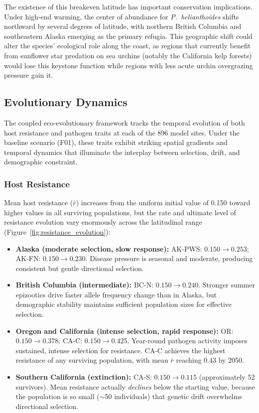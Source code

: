 The existence of this breakeven latitude has important conservation
implications.  Under high-end warming, the center of abundance for
\textit{P.~helianthoides} shifts northward by several degrees of
latitude, with northern British Columbia and southeastern Alaska
emerging as the primary refugia.  This geographic shift could alter the
species' ecological role along the coast, as regions that currently
benefit from sunflower star predation on sea urchins (notably the
California kelp forests) would lose this keystone function while
regions with less acute urchin overgrazing pressure gain it.

\subsection{Evolutionary Dynamics}
\label{sec:evo_dynamics}

The coupled eco-evolutionary framework tracks the temporal evolution of
both host resistance and pathogen traits at each of the 896 model
sites.  Under the baseline scenario (F01), these traits exhibit
striking spatial gradients and temporal dynamics that illuminate the
interplay between selection, drift, and demographic constraint.

\subsubsection{Host Resistance}

Mean host resistance ($\bar{r}$) increases from the uniform initial
value of 0.150 toward higher values in all surviving populations, but
the rate and ultimate level of resistance evolution vary enormously
across the latitudinal range
(Figure~\ref{fig:resistance_evolution}):

\begin{itemize}
  \item \textbf{Alaska (moderate selection, slow response):}
    AK-PWS: $0.150 \rightarrow 0.253$;
    AK-FN: $0.150 \rightarrow 0.230$.
    Disease pressure is seasonal and moderate, producing
    consistent but gentle directional selection.
  \item \textbf{British Columbia (intermediate):}
    BC-N: $0.150 \rightarrow 0.240$.
    Stronger summer epizootics drive faster allele frequency
    change than in Alaska, but demographic stability maintains
    sufficient population sizes for effective selection.
  \item \textbf{Oregon and California (intense selection, rapid
    response):}
    OR: $0.150 \rightarrow 0.378$;
    CA-C: $0.150 \rightarrow 0.425$.
    Year-round pathogen activity imposes sustained, intense
    selection for resistance.  CA-C achieves the highest
    resistance of any surviving population, with mean $\bar{r}$
    reaching 0.43 by 2050.
  \item \textbf{Southern California (extinction):}
    CA-S: $0.150 \rightarrow 0.115$ (approximately 52 survivors).
    Mean resistance actually \textit{declines} below the starting
    value, because the population is so small (${\sim}$50 individuals)
    that genetic drift overwhelms directional selection.
\end{itemize}

